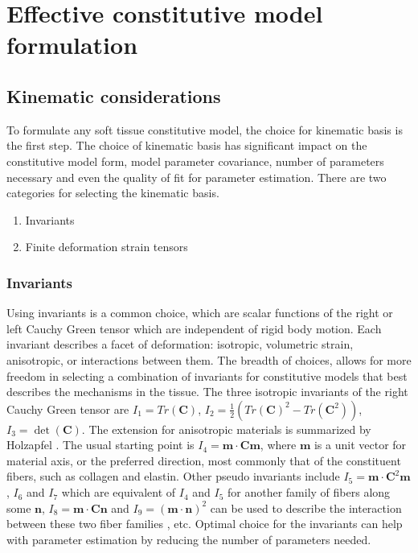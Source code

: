 
\section{Effective constitutive model formulation}

\subsection{Kinematic considerations}
	
	To formulate any soft tissue constitutive model, the choice for kinematic basis is the first step. The choice of kinematic basis has significant impact on the constitutive model form, model parameter covariance, number of parameters necessary and even the quality of fit for parameter estimation. There are two categories for selecting the kinematic basis. 
\begin{enumerate}
\item Invariants
\item Finite deformation strain tensors
\end{enumerate}

\subsubsection{Invariants} \label{sec:invariants}
	Using invariants is a common choice, which are scalar functions of the right or left Cauchy Green tensor which are independent of rigid body motion. Each invariant describes a facet of deformation: isotropic, volumetric strain, anisotropic, or interactions between them. The breadth of choices, allows for more freedom in selecting a combination of invariants for constitutive models that best describes the mechanisms in the tissue. The three isotropic invariants of the right Cauchy Green tensor are $I_1 = Tr(\mathbf{C})$, $I_2 = \frac{1}{2}\left( Tr(\mathbf{C})^2 - Tr(\mathbf{C}^2)\right)$, $I_3 = \det(\mathbf{C})$. The extension for anisotropic materials is summarized by Holzapfel \cite{holzapfel_nonlinear_2000}. The usual starting point is $I_4 = \mathbf{m}\cdot \mathbf{C} \mathbf{m}$, where $\mathbf{m}$ is a unit vector for material axis, or the preferred direction, most commonly that of the constituent fibers, such as collagen and elastin. Other pseudo invariants include $I_5 = \mathbf{m}\cdot \mathbf{C}^2 \mathbf{m}$, $I_6$ and $I_7$ which are equivalent of $I_4$ and $I_5$ for another family of fibers along some $\mathbf{n}$, $I_8 = \mathbf{m}\cdot\mathbf{C}\mathbf{n}$ and $I_9 = (\mathbf{m}\cdot\mathbf{n})^2$ can be used to describe the interaction between these two fiber families \cite{sacks_novel_2016}\cite{avazmohammadi_novel_2017}, etc. Optimal choice for the invariants can help with parameter estimation by reducing the number of parameters needed. 


